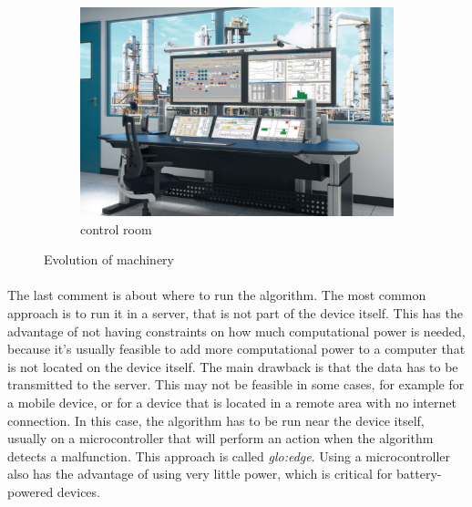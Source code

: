 \begin{figure}
\begin{subfigure}{0.3\textwidth}
        \includegraphics[width=\textwidth]{images/Intro/control-rooms-workstations.jpg}
        \caption{control room \cite{evosite}}
        \label{fig:controlroom}
    \end{subfigure}
    \caption{Evolution of machinery}
    \label{fig:machineryevolution}
\end{figure}

\paragraph*{}
The last comment is about where to run the algorithm. The most common approach is to run it in a server, that is not part of the device itself. This has the advantage of not having constraints on how much computational power is needed, because it's usually feasible to add more computational power to a computer that is not located on the device itself. The main drawback is that the data has to be transmitted to the server. This may not be feasible in some cases, for example for a mobile device, or for a device that is located in a remote area with no internet connection. In this case, the algorithm has to be run near the device itself, usually on a microcontroller that will perform an action when the algorithm detects a malfunction. This approach is called \emph{\gls{glo:edge}}. Using a microcontroller also has the advantage of using very little power, which is critical for battery-powered devices.


